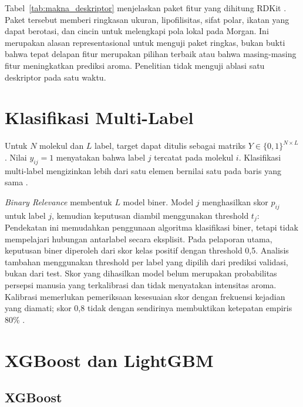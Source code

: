 Tabel~\ref{tab:makna_deskriptor} menjelaskan paket fitur yang dihitung RDKit \cite{rdkitdescriptors2026}. Paket tersebut memberi ringkasan ukuran, lipofilisitas, sifat polar, ikatan yang dapat berotasi, dan cincin untuk melengkapi pola lokal pada Morgan. Ini merupakan alasan representasional untuk menguji paket ringkas, bukan bukti bahwa tepat delapan fitur merupakan pilihan terbaik atau bahwa masing-masing fitur meningkatkan prediksi aroma. Penelitian tidak menguji ablasi satu deskriptor pada satu waktu.

\section{Klasifikasi Multi-Label}

Untuk $N$ molekul dan $L$ label, target dapat ditulis sebagai matriks $Y \in \{0,1\}^{N \times L}$. Nilai $y_{ij}=1$ menyatakan bahwa label $j$ tercatat pada molekul $i$. Klasifikasi multi-label mengizinkan lebih dari satu elemen bernilai satu pada baris yang sama \cite{tsoumakas2007}.

\textit{Binary Relevance} membentuk $L$ model biner. Model $j$ menghasilkan skor $p_{ij}$ untuk label $j$, kemudian keputusan diambil menggunakan threshold $t_j$:
Pendekatan ini memudahkan penggunaan algoritma klasifikasi biner, tetapi tidak mempelajari hubungan antarlabel secara eksplisit. Pada pelaporan utama, keputusan biner diperoleh dari skor kelas positif dengan threshold 0,5. Analisis tambahan menggunakan threshold per label yang dipilih dari prediksi validasi, bukan dari test. Skor yang dihasilkan model belum merupakan probabilitas persepsi manusia yang terkalibrasi dan tidak menyatakan intensitas aroma. Kalibrasi memerlukan pemeriksaan kesesuaian skor dengan frekuensi kejadian yang diamati; skor 0,8 tidak dengan sendirinya membuktikan ketepatan empiris 80\% \cite{sklearncalibration2026}.

\section{XGBoost dan LightGBM}

\subsection{XGBoost}


